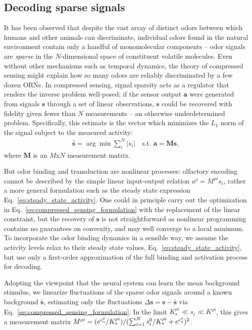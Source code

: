 \documentclass[9pt,twocolumn,twoside]{pnas-new}
\begin{document}
\subsection*{Decoding sparse signals}
It has been observed that despite the vast array of distinct odors between which humans and other animals can discriminate, individual odors found in the natural environment contain only a handful of monomolecular components -- odor signals are \textit{sparse} in the $N$-dimensional space of constituent volatile molecules. Even without other mechanisms such as temporal dynamics, the theory of compressed sensing might explain how so many odors are reliably discriminated by a few dozen ORNs. In compressed sensing, signal sparsity acts as a regulator that renders the inverse problem well-posed; if the sensor output $\mathbf a$ were generated from signals $\mathbf s$ through a set of linear observations, $\mathbf s$ could be recovered with fidelity given fewer than $N$ measurements -- an otherwise underdetermined problem. %
Specifically, this estimate is the vector which minimizes the $L_1$ norm of the signal subject to the measured activity:
\begin{align}
\hat {\mathbf s} = \arg \min \sum_i^N |s_i| \quad \text {s.t.  } \mathbf a = \mathbf M \mathbf s,
\label{eq:compressed_sensing_formulation}
\end{align}
where $\mathbf M$ is an $M$x$N$ measurement matrix.

But odor binding and transduction are nonlinear processes: olfactory encoding cannot be described by the simple linear input-output relation $a^\rho = M^{\rho i} s_i$, rather a more general formulation such as the steady state expression Eq.~\ref{eq:steady_state_activity}. One could in principle carry out the optimization in Eq.~\ref{eq:compressed_sensing_formulation} with the replacement of the linear constraint,  but the recovery of $\mathbf s$ is not straightforward as nonlinear programming contains no guarantees on convexity, and may well converge to a local minimum. To incorporate the odor binding dynamics in a sensible way, we assume the activity levels relax to their steady state values, Eq.~\ref{eq:steady_state_activity}, but use only a first-order approximation of the full binding and activation process for decoding. 

Adopting the viewpoint that the neural system can learn the mean background stimulus, we linearize fluctuations of the sparse odor signals around a known background $\bar{\mathbf s}$, estimating only the fluctuations $\Delta \mathbf s = \mathbf s - \bar{\mathbf s}$ via Eq.~\ref{eq:compressed_sensing_formulation}. In the limit $K_*^{\rho i} \ll s_i \ll K^{\rho i}$, this gives a measurement matrix $M^{\rho i} = (e^{\epsilon^\rho_{\text u}}/K_*^{\rho i})/(\sum_{i=1}^N s_i^0/K_*^{\rho i} + e^{\epsilon^\rho_{\text u}})^2$. 
\end{document}
